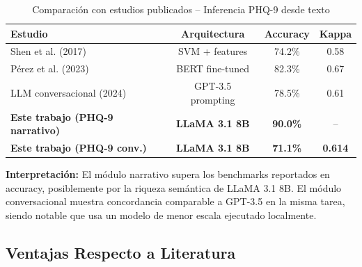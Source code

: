 \begin{table}[H]
\centering
\caption{Comparación con estudios publicados -- Inferencia PHQ-9 desde texto}
\label{tab:literature_phq9}
\begin{tabular}{lccc}
\toprule
\textbf{Estudio}                                  & \textbf{Arquitectura}   & \textbf{Accuracy} & \textbf{Kappa} \\
\midrule
Shen et al. (2017) \cite{shen2017cross}            & SVM + features          & 74.2\%            & 0.58           \\
Pérez et al. (2023) \cite{perez2023chatbot_phq9}   & BERT fine-tuned         & 82.3\%            & 0.67           \\
LLM conversacional (2024) \cite{ma2024llm_phq}     & GPT-3.5 prompting       & 78.5\%            & 0.61           \\
\midrule
\textbf{Este trabajo (PHQ-9 narrativo)} & \textbf{LLaMA 3.1 8B} & \textbf{90.0\%}   & --             \\
\textbf{Este trabajo (PHQ-9 conv.)}     & \textbf{LLaMA 3.1 8B} & \textbf{71.1\%}   & \textbf{0.614} \\
\bottomrule
\end{tabular}
\end{table}

\textbf{Interpretación:}
El módulo narrativo supera los benchmarks reportados en accuracy, posiblemente por la
riqueza semántica de LLaMA 3.1 8B. El módulo conversacional muestra concordancia
comparable a GPT-3.5 en la misma tarea, siendo notable que usa un modelo de menor
escala ejecutado localmente.

\subsection{Ventajas Respecto a Literatura}

